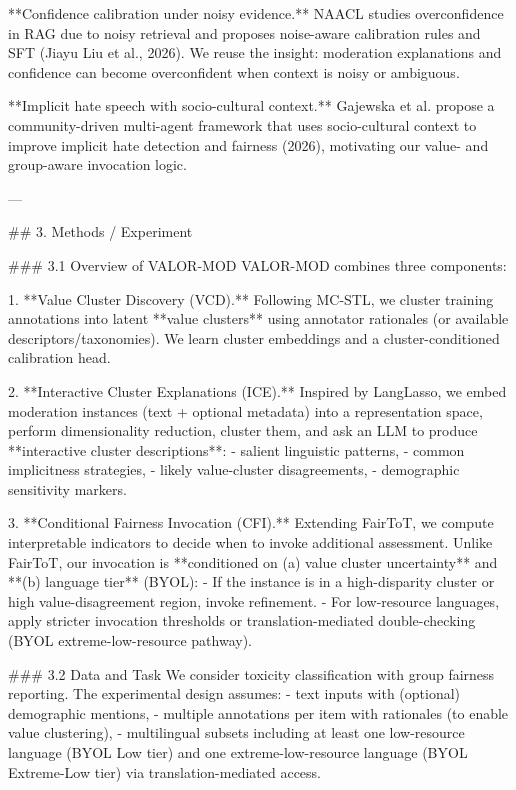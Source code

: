 **Confidence calibration under noisy evidence.** NAACL studies overconfidence in RAG due to noisy retrieval and proposes noise-aware calibration rules and SFT (Jiayu Liu et al., 2026). We reuse the insight: moderation explanations and confidence can become overconfident when context is noisy or ambiguous.

**Implicit hate speech with socio-cultural context.** Gajewska et al. propose a community-driven multi-agent framework that uses socio-cultural context to improve implicit hate detection and fairness (2026), motivating our value- and group-aware invocation logic.

---

## 3. Methods / Experiment

### 3.1 Overview of VALOR-MOD
VALOR-MOD combines three components:

1. **Value Cluster Discovery (VCD).**  
   Following MC‑STL, we cluster training annotations into latent **value clusters** using annotator rationales (or available descriptors/taxonomies). We learn cluster embeddings and a cluster-conditioned calibration head.

2. **Interactive Cluster Explanations (ICE).**  
   Inspired by LangLasso, we embed moderation instances (text + optional metadata) into a representation space, perform dimensionality reduction, cluster them, and ask an LLM to produce **interactive cluster descriptions**:
   - salient linguistic patterns,
   - common implicitness strategies,
   - likely value-cluster disagreements,
   - demographic sensitivity markers.

3. **Conditional Fairness Invocation (CFI).**  
   Extending FairToT, we compute interpretable indicators to decide when to invoke additional assessment. Unlike FairToT, our invocation is **conditioned on (a) value cluster uncertainty** and **(b) language tier** (BYOL):
   - If the instance is in a high-disparity cluster or high value-disagreement region, invoke refinement.
   - For low-resource languages, apply stricter invocation thresholds or translation-mediated double-checking (BYOL extreme-low-resource pathway).

### 3.2 Data and Task
We consider toxicity classification with group fairness reporting. The experimental design assumes:
- text inputs with (optional) demographic mentions,
- multiple annotations per item with rationales (to enable value clustering),
- multilingual subsets including at least one low-resource language (BYOL Low tier) and one extreme-low-resource language (BYOL Extreme-Low tier) via translation-mediated access.

